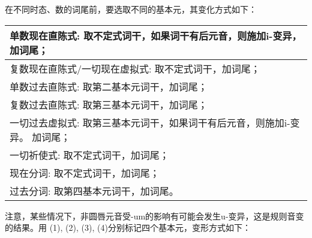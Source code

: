 在不同时态、数的词尾前，要选取不同的基本元，其变化方式如下：

\begin{longtable}{l}
  \toprule
  单数现在直陈式: 取不定式词干，如果词干有后元音，则施加i-变异，加词尾； \\
  \midrule
  \endhead
  \bottomrule
  \endfoot
  复数现在直陈式/一切现在虚拟式: 取不定式词干，加词尾；                  \\
  单数过去直陈式: 取第二基本元词干，加词尾；                             \\
  复数过去直陈式: 取第三基本元词干，加词尾；                             \\
  一切过去虚拟式: 取第三基本元词干，如果词干有后元音，则施加i-变异。
  加词尾；                                                               \\
  一切祈使式: 取不定式词干，加词尾；                                     \\
  现在分词: 取不定式词干，加词尾；                                       \\
  过去分词: 取第四基本元词干，加词尾。                                   \\
\end{longtable}

注意，某些情况下，非圆唇元音受-um的影响有可能会发生u-变异，这是规则音变的结果。用
(1), (2), (3), (4)分别标记四个基本元，变形方式如下：

